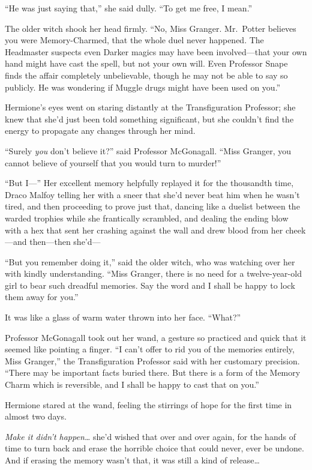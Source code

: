 ``He was just saying that,'' she said dully. ``To get me free, I mean.''

The older witch shook her head firmly. ``No, Miss Granger. Mr.~Potter
believes you were Memory-Charmed, that the whole duel never happened.
The Headmaster suspects even Darker magics may have been involved---that
your own hand might have cast the spell, but not your own will. Even
Professor Snape finds the affair completely unbelievable, though he may
not be able to say so publicly. He was wondering if Muggle drugs might
have been used on you.''

Hermione's eyes went on staring distantly at the Transfiguration
Professor; she knew that she'd just been told something significant, but
she couldn't find the energy to propagate any changes through her mind.

``Surely \emph{you} don't believe it?'' said Professor McGonagall.
``Miss Granger, you cannot believe of yourself that you would turn to
murder!''

``But I---'' Her excellent memory helpfully replayed it for the
thousandth time, Draco Malfoy telling her with a sneer that she'd never
beat him when he wasn't tired, and then proceeding to prove just that,
dancing like a duelist between the warded trophies while she frantically
scrambled, and dealing the ending blow with a hex that sent her crashing
against the wall and drew blood from her cheek---and then---then
she'd---

``But you remember doing it,'' said the older witch, who was watching
over her with kindly understanding. ``Miss Granger, there is no need for
a twelve-year-old girl to bear such dreadful memories. Say the word and
I shall be happy to lock them away for you.''

It was like a glass of warm water thrown into her face. ``What?''

Professor McGonagall took out her wand, a gesture so practiced and quick
that it seemed like pointing a finger. ``I can't offer to rid you of the
memories entirely, Miss Granger,'' the Transfiguration Professor said
with her customary precision. ``There may be important facts buried
there. But there is a form of the Memory Charm which is reversible, and
I shall be happy to cast that on you.''

Hermione stared at the wand, feeling the stirrings of hope for the first
time in almost two days.

\emph{Make it didn't happen\ldots{}} she'd wished that over and over
again, for the hands of time to turn back and erase the horrible choice
that could never, ever be undone. And if erasing the memory wasn't that,
it was still a kind of release\ldots{}

